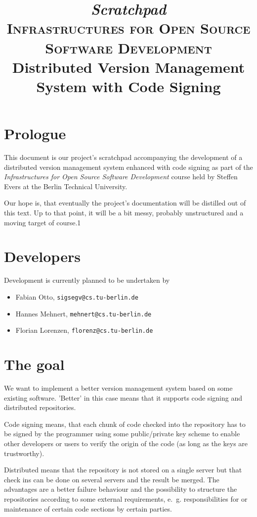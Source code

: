 \documentclass[fleqn, german, 10pt, a4paper]{article}
\begin{document}
\title{\emph{Scratchpad}\\
{\scshape Infrastructures for Open Source Software Development}\\
Distributed Version Management System with Code Signing}
\maketitle

\tableofcontents

\section{Prologue}
This document is our project's scratchpad accompanying the development
of a distributed version management system enhanced with code signing as
part of the \emph{Infrastructures for Open Source Software Development}
course held by Steffen Evers at the Berlin Technical University.

Our hope is, that eventually the project's documentation will be
distilled out of this text. Up to that point, it will be a bit messy,
probably unstructured and a moving target of course.1

\section{Developers}
Development is currently planned to be undertaken by
\begin{itemize}
\item Fabian Otto, \texttt{sigsegv@cs.tu-berlin.de}
\item Hannes Mehnert, \texttt{mehnert@cs.tu-berlin.de}
\item Florian Lorenzen, \texttt{florenz@cs.tu-berlin.de}
\end{itemize}

\section{The goal}
We want to implement a better version management system based on
some existing software. 'Better' in this case means that it supports
code signing and distributed repositories.

Code signing means, that each chunk of code checked into the repository
has to be signed by the programmer using some public/private key scheme
to enable other developers or users to verify the origin of the code (as
long as the keys are trustworthy).

Distributed means that the repository is not stored on a single server
but that check ins can be done on several servers and the result be
merged. The advantages are a better failure behaviour and the
possibility to structure the repositories according to some external
requirements, e.~g. responsibilities for or maintenance of certain code
sections by certain parties.
\end{document}
